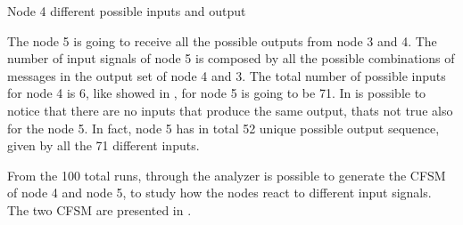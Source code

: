 \begin{table}[h]
	
	\caption{Node 4 different possible inputs and output}
	\label{tbl:fig_4_node4_possible_inputs}
\end{table}

The node \num{5} is going to receive all the possible outputs from node \num{3} and
\num{4}.
The number of input signals of node \num{5} is composed by all the possible
combinations of messages in the output set of node \num{4} and \num{3}.
The total number of possible inputs for node \num{4} is \num{6}, like
showed in , for node \num{5} is going
to be \num{71}.
In  is possible to notice that
there are no inputs that produce the same output, thats not true also for
the node \num{5}.
In fact, node \num{5} has in total \num{52} unique possible output sequence,
given by all the \num{71} different inputs.

From the \num{100} total runs, through the analyzer is possible to generate
the \ac{CFSM} of node \num{4} and node \num{5}, to study how the nodes react
to different input signals.
The two \ac{CFSM} are presented in .

